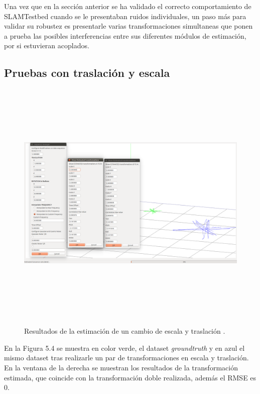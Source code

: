 Una vez que en la sección anterior se ha validado el correcto comportamiento de SLAMTestbed cuando se le presentaban ruidos individuales, un paso más para validar su robustez es presentarle varias transformaciones simultaneas que ponen a prueba las posibles interferencias entre sus diferentes módulos de estimación, por si estuvieran acoplados.

\subsection{Pruebas con traslación y escala}

\begin{figure}[h]
\begin{center}
\label{fig:traslaEscalaTest}\includegraphics[height=12.0cm,width=18.0cm]{img/cap6/Escala_Traslacion_abba.png}
\hspace{0.5cm}

\end{center}

\caption{Resultados de la estimación de un cambio de escala y traslación .}
\end{figure}

En la Figura 5.4 se muestra en color verde, el dataset \textit{groundtruth} y en azul el mismo dataset tras realizarle un par de transformaciones en escala y traslación.
En la ventana de la derecha se muestran los resultados de la transformación estimada, que coincide con la transformación doble realizada, además el RMSE es 0.

